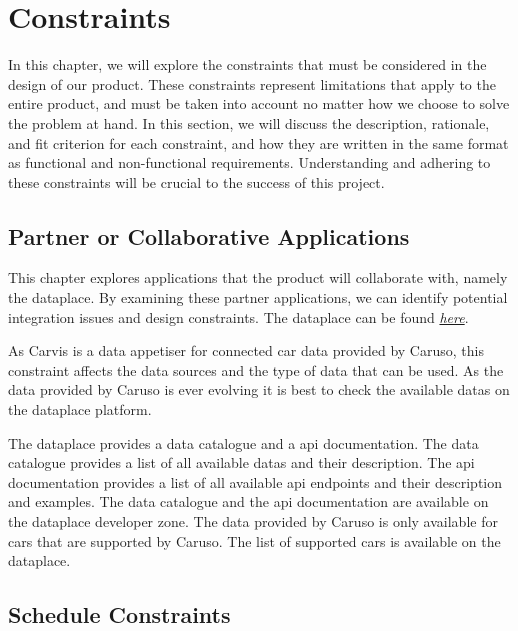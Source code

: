 \chapter{Constraints}

In this chapter, we will explore the constraints that must be considered in the design of our product. These constraints represent limitations that apply to the entire product, and must be taken into account no matter how we choose to solve the problem at hand. In this section, we will discuss the description, rationale, and fit criterion for each constraint, and how they are written in the same format as functional and non-functional requirements. Understanding and adhering to these constraints will be crucial to the success of this project.

\section{Partner or Collaborative Applications}

This chapter explores applications that the product will collaborate with, namely the \gls{dataplace}. By examining these partner applications, we can identify potential integration issues and design constraints. The dataplace can be found \href{https://www.caruso-dataplace.com/developer-zone/}{\emph{here}}.

As Carvis is a data appetiser for connected car data provided by Caruso, this constraint affects the data sources and the type of data that can be used. As the data provided by Caruso is ever evolving it is best to check the available \glspl{data} on the \gls{dataplace} platform. 

The \gls{dataplace} provides a data catalogue and a \gls{api} documentation. The data catalogue provides a list of all available \glspl{data} and their description. The \gls{api} documentation provides a list of all available \gls{api} endpoints and their description and examples. The data catalogue and the \gls{api} documentation are available on the \gls{dataplace} developer zone. The data provided by Caruso is only available for cars that are supported by Caruso. The list of supported cars is available on the \gls{dataplace}.

\section{Schedule Constraints}

